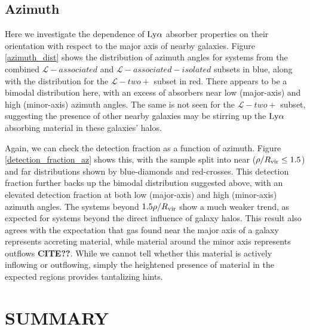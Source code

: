 \documentclass[twocolumn,tighten]{aastex62}
\begin{document}
\subsection{Azimuth}
Here we investigate the dependence of $\rm Ly\alpha$ absorber properties on their orientation with respect to the major axis of nearby galaxies. Figure \ref{azimuth_dist} shows the distribution of azimuth angles for systems from the combined $\mathcal{L}-associated$ and $\mathcal{L}-associated-isolated$ subsets in blue, along with the distribution for the $\mathcal{L}-two+$ subset in red. There appears to be a bimodal distribution here, with an excess of absorbers near low (major-axis) and high (minor-axis) azimuth angles. The same is not seen for the 
$\mathcal{L}-two+$ subset, suggesting the presence of other nearby galaxies may be stirring up the $\rm Ly\alpha$ absorbing material in these galaxies' halos. 

Again, we can check the detection fraction as a function of azimuth. Figure \ref{detection_fraction_az} shows this, with the sample split into near ($\rho / R_{\rm vir} \leq 1.5$) and far distributions shown by blue-diamonds and red-crosses. This detection fraction further backs up the bimodal distribution suggested above, with an elevated detection fraction at both low (major-axis) and high (minor-axis) azimuth angles. The systems beyond $1.5 \rho / R_{\rm vir}$ show a much weaker trend, as expected for systems beyond the direct influence of galaxy halos. This result also agrees with the expectation that gas found near the major axis of a galaxy represents accreting material, while material around the minor axis represents outflows \textbf{CITE??}. While we cannot tell whether this material is actively inflowing or outflowing, simply the heightened presence of material in the expected regions provides tantalizing hints.






\section{SUMMARY}
\end{document}
